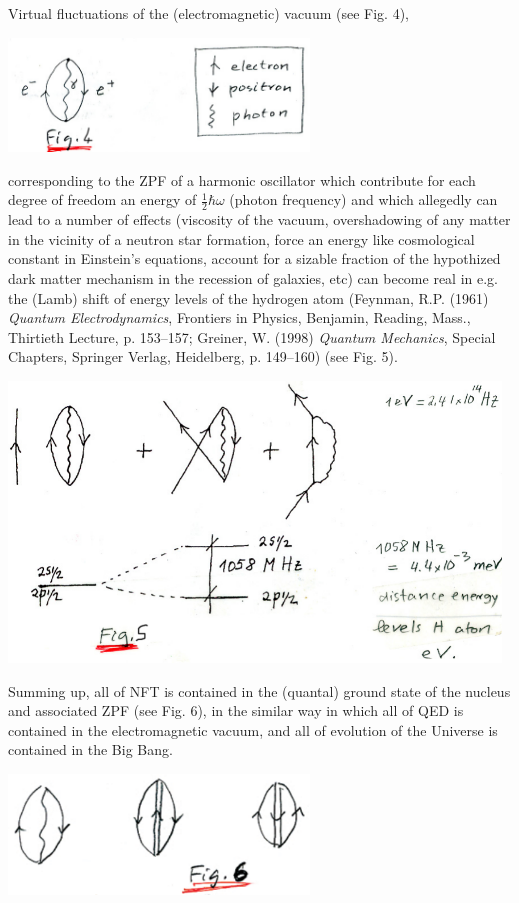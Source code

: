 \documentclass[a4paper,onecolumn,superscriptaddress,12pt,nofootinbib,twoside,raggedfooter,notitlepage]{revtex4-1}
\begin{document}
Virtual fluctuations of the (electromagnetic) vacuum (see Fig. 4),
\begin{center}
	\includegraphics[width=0.6\textwidth]{figs/fig_i2}
\end{center}
corresponding to the ZPF of a harmonic oscillator which contribute for each degree of freedom an energy of $\frac{1}{2}\hbar \omega$ (photon frequency) and which allegedly can lead to a number of effects (viscosity of the vacuum, overshadowing of any matter in the vicinity of a neutron star formation, force an energy like cosmological constant in Einstein's equations, account for a sizable fraction of the hypothized dark matter mechanism in the recession of galaxies, etc) can become real in e.g. the (Lamb) shift of energy levels of the hydrogen atom (Feynman, R.P. (1961) \emph{Quantum Electrodynamics}, Frontiers in Physics, Benjamin, Reading, Mass., Thirtieth Lecture, p. 153--157; Greiner, W. (1998) \emph{Quantum Mechanics}, Special Chapters, Springer Verlag, Heidelberg, p. 149--160) (see Fig. 5).
\begin{center}
	\includegraphics[width=0.98\textwidth]{figs/fig_i3}
\end{center}

Summing up, all of NFT is contained in the (quantal) ground state of the nucleus and associated ZPF (see Fig. 6), in the similar way in which all of QED is contained in the electromagnetic vacuum, and all of evolution of the Universe is contained in the Big Bang.
\begin{center}
	\includegraphics[width=0.6\textwidth]{figs/fig_i4}
\end{center}
\end{document}
